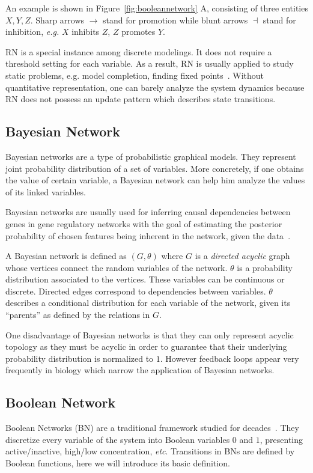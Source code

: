 An example is shown in Figure~\ref{fig:booleannetwork} A, consisting of three entities $X,Y,Z$.
Sharp arrows $\to$ stand for promotion while blunt arrows $\dashv$ stand for inhibition,
\textit{e.g.} $X$ inhibits $Z$, $Z$ promotes $Y$.

RN is a special instance among discrete modelings.
It does not require a threshold setting for each variable.
As a result, RN is usually applied to study static problems, e.g. model completion, finding fixed points~\cite{yamamoto2014completing}.
Without quantitative representation, one can barely analyze the system dynamics because RN does not possess an update pattern which describes state transitions.

\subsection{Bayesian Network}
Bayesian networks are a type of probabilistic graphical models. 
They represent joint probability distribution of a set of variables.
More concretely, if one obtains the value of certain variable, a Bayesian network can help him analyze the values of its linked variables.

Bayesian networks are usually used for inferring causal dependencies between genes in gene regulatory networks with the goal of estimating the posterior probability of chosen features being inherent in the network, given the data~\cite{friedman2000using}.

A Bayesian network is defined as $(G, \theta)$ where $G$ is a \textit{directed acyclic} graph whose vertices connect the random variables of the network.
$\theta$ is a probability distribution associated to the vertices. 
These variables can be continuous or discrete. 
Directed edges correspond to dependencies between variables. 
$\theta$ describes a conditional distribution for each variable of the network, given its ``parents'' as defined by the relations in $G$.

One disadvantage of Bayesian networks is that they can only represent acyclic topology as they must be acyclic in order to guarantee that their underlying probability distribution is normalized to $1$.
However feedback loops appear very frequently in biology which narrow the application of Bayesian networks.

\subsection{Boolean Network}
Boolean Networks (BN) are a traditional framework studied for decades~\cite{kauffman1969}.
They discretize every variable of the system into Boolean variables $0$ and $1$, presenting active/inactive, high/low concentration, \textit{etc}. 
Transitions in BNs are defined by Boolean functions, here we will introduce its basic definition.

